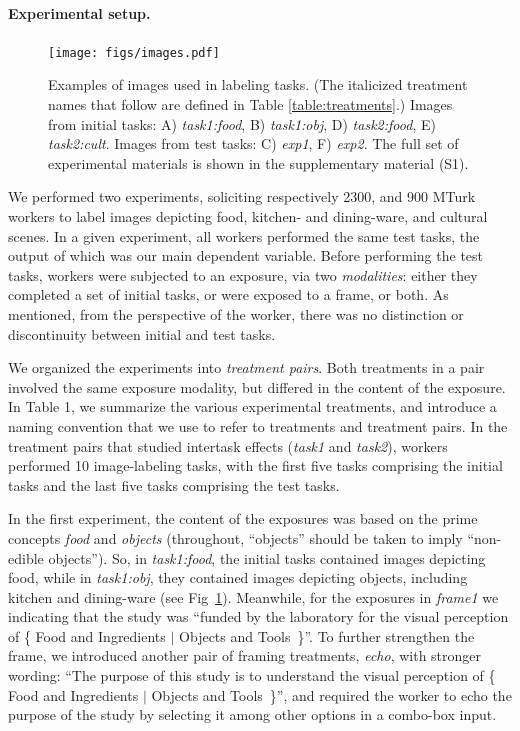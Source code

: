 \documentclass[12pt]{article}
\begin{document}
\paragraph{Experimental setup.}
\begin{figure}
	\centering
	\texttt{[image: figs/images.pdf]}
	\caption{
		Examples of images used in labeling tasks. (The italicized treatment 
		names that follow are defined in Table \ref{table:treatments}.) Images 
		from initial tasks: A) \textit{task1:food}, B) 
		\textit{task1:obj}, D) \textit{task2:food}, 
		E) \textit{task2:cult}.  Images from  test tasks: C) \textit{exp1}, 
		F) \textit{exp2}.  The full set of experimental materials is 
		shown in the supplementary material (S1).
	}

	\label{fig:task}
\end{figure}
We performed two experiments, soliciting respectively 2300, and 900 MTurk 
workers to label images depicting food, kitchen- and dining-ware, and cultural
scenes.  In a given experiment, all workers performed the same test
tasks, the output of which was our main dependent variable.  Before performing
the test tasks, workers were subjected to an exposure, via two 
\textit{modalities}: either they completed a set of initial tasks, or 
were exposed to a frame, or both.  As mentioned, from the perspective of the worker, 
there was no distinction or discontinuity between initial and test tasks.

We organized the experiments into \textit{treatment pairs}.  Both treatments in a 
pair involved the same exposure modality, but differed in the
content of the exposure.  In Table 1, we summarize the various experimental
treatments, and introduce a naming convention that we use to refer to 
treatments and treatment pairs.
In the treatment pairs that studied intertask effects (\textit{task1} and
\textit{task2}), workers performed 10 image-labeling tasks, with the first 
five tasks comprising the initial tasks and the last five tasks comprising the
test tasks.

In the first experiment, the content of the exposures was based on the prime
concepts \textit{food} and \textit{objects} (throughout, ``objects'' should be
taken to imply ``non-edible objects'').  So, 
in \textit{task1:food}, the initial tasks contained images depicting food, 
while in \textit{task1:obj}, they contained images depicting objects, 
including kitchen and dining-ware (see Fig~\ref{fig:task}).  Meanwhile, 
for the exposures in \textit{frame1} we indicating that the study was
``funded by the laboratory for the visual perception of \{ Food and Ingredients
$\vert$ Objects and Tools~\}''.  To further strengthen the frame, we 
introduced another pair of framing treatments, \textit{echo}, with stronger
wording: ``The purpose of this study is to understand the visual perception
of \{ Food and Ingredients $\vert$ Objects and Tools~\}'', and required
the worker to echo the purpose of the study by selecting it among other 
options in a combo-box input.
\end{document}
